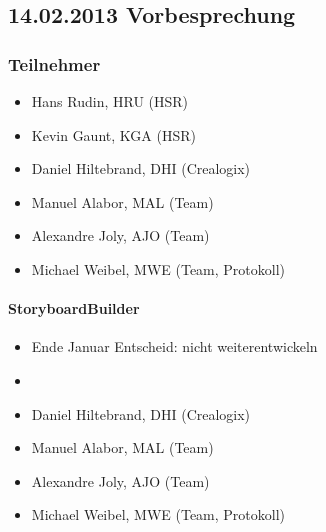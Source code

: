 \subsection*{14.02.2013 Vorbesprechung}

\subsubsection*{Teilnehmer}

\begin{itemize}
	\item Hans Rudin, HRU (HSR)
	\item Kevin Gaunt, KGA (HSR)
	\item Daniel Hiltebrand, DHI (Crealogix)
	\item Manuel Alabor, MAL (Team)
	\item Alexandre Joly, AJO (Team)
	\item Michael Weibel, MWE (Team, Protokoll)
\end{itemize}

\paragraph*{StoryboardBuilder}
\begin{itemize}
	\item Ende Januar Entscheid: nicht weiterentwickeln
	\item
	\item Daniel Hiltebrand, DHI (Crealogix)
	\item Manuel Alabor, MAL (Team)
	\item Alexandre Joly, AJO (Team)
	\item Michael Weibel, MWE (Team, Protokoll)
\end{itemize}
